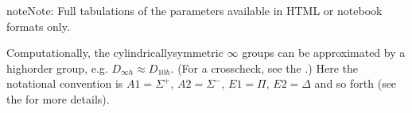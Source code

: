 \documentclass[letterpaper,table,10pt,english]{jupyterBook}
\begin{document}
\begin{sphinxShadowBox}
\sphinxstylesidebartitle{}

\begin{sphinxadmonition}{note}{Note:}
\sphinxAtStartPar
Full tabulations of the parameters available in HTML or notebook formats only.
\end{sphinxadmonition}
\end{sphinxShadowBox}

\sphinxAtStartPar
Computationally, the cylindrically\sphinxhyphen{}symmetric \(\infty\) groups can be approximated by a high\sphinxhyphen{}order group, e.g. \(D_{\infty h} \approx D_{10h}\). (For a cross\sphinxhyphen{}check, see the .)  Here the notational convention is \(A1 = \Sigma^{+}\), \(A2 = \Sigma^{-}\), \(E1 = \Pi\), \(E2 = \Delta\) and so forth (see the  for more details).
\end{document}
